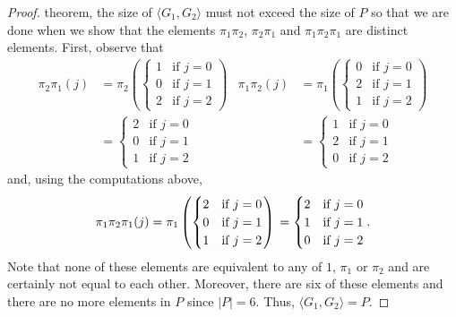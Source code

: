 \begin{proof}
theorem, the size of $\langle G_1,G_2\rangle$ must not exceed the size of
$P$ so that we are done when we show that the elements $\pi_1\pi_2$,
$\pi_2\pi_1$ and $\pi_1\pi_2\pi_1$ are distinct elements. First, observe that
\begin{align*}
\pi_2\pi_1(j)&=
\pi_2\left(
\begin{cases}
1&\text{if $j=0$}\\
0&\text{if $j=1$}\\
2&\text{if $j=2$}
\end{cases}
\right)
&
\pi_1\pi_2(j)&=
\pi_1\left(
\begin{cases}
0&\text{if $j=0$}\\
2&\text{if $j=1$}\\
1&\text{if $j=2$}
\end{cases}
\right)
\\
&=
\begin{cases}
2&\text{if $j=0$}\\
0&\text{if $j=1$}\\
1&\text{if $j=2$}
\end{cases}
&&=
\begin{cases}
1&\text{if $j=0$}\\
2&\text{if $j=1$}\\
0&\text{if $j=2$}
\end{cases}
\end{align*}
and, using the computations above,
\[
\pi_1\pi_2\pi_1(j)=
\pi_1\left(
\begin{cases}
2&\text{if $j=0$}\\
0&\text{if $j=1$}\\
1&\text{if $j=2$}
\end{cases}
\right)\\
=
\begin{cases}
2&\text{if $j=0$}\\
1&\text{if $j=1$}\\
0&\text{if $j=2$}
\end{cases}.
\]
Note that none of these elements are equivalent to any of $1$, $\pi_1$ or
$\pi_2$ and are certainly not equal to each other. Moreover, there are six
of these elements and there are no more elements in $P$ since
$|P|=6$. Thus, $\langle G_1,G_2 \rangle=P$.


\end{proof}
